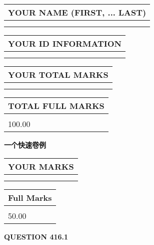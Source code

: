 \documentclass{ctexart}
\begin{document}
 
 
 
 
   
   
\newpage 
\setcounter{page}{ 
   416001 } 
   
   
   
   
\noindent\begin{tabular}{|l|}
\hline
YOUR NAME (FIRST, ... LAST)  \\
\hline
 \\ 
 \\ 
\hline
\end{tabular}
\hspace{0.05in} \begin{tabular}{|l|}
\hline
 YOUR   ID   INFORMATION  \\
\hline
 \\ 
 \\ 
\hline
\end{tabular}
   
   
\vspace{0.2in}\noindent\begin{tabular}{|l|}
\hline
YOUR TOTAL MARKS  \\
\hline
 \\ 
 \\ 
\hline
\end{tabular}
\hspace{0.05in} \begin{tabular}{|l|}
\hline
TOTAL FULL MARKS  \\
\hline
 \\ 
100.00 \\
\hline
\end{tabular}
   
   
 \vspace{0.2in}
{\LARGE {\textbf{ 一个快速卷例}}}
   
   
  
\vspace{0.2in}
  
\noindent\begin{tabular}{|l|}
\hline
 YOUR MARKS  \\
\hline
 \\ 
 \\ 
\hline
\end{tabular}
\hspace{0.05in} \begin{tabular}{|l|}
\hline
 Full Marks  \\
\hline
 \\ 
50.00 \\
\hline
\end{tabular}
{\textbf{\Large{QUESTION
416.1 
}}}
  
\end{document}
